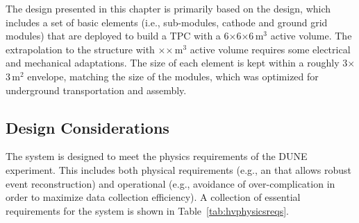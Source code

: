 The design presented in this chapter is primarily based on the  design, which includes a set of basic elements (i.e.,  sub-modules, cathode and ground grid modules) that are deployed to build a TPC with a 6$\times$6$\times$6\,m$^3$ active volume. The extrapolation to the  structure with 
\tpcheight$\times$\dptpcwdth$\times$\dptpclen\,m$^3$ active volume %
requires some electrical and mechanical adaptations.  The size of each element is kept within a roughly 3$\times$3\,m$^2$ envelope, matching the size of the   modules, which was optimized for underground transportation and assembly.




\subsection{Design Considerations}
\label{sec:fddp-hv-des-consid}


The  system is designed to meet the physics requirements of the DUNE experiment. This includes both physical requirements (e.g., an \efield 
that allows robust event reconstruction) and operational (e.g., 
avoidance of over-complication in order to maximize data collection efficiency). 
A collection of essential requirements for the  system is shown in Table~\ref{tab:hvphysicsreqs}.

